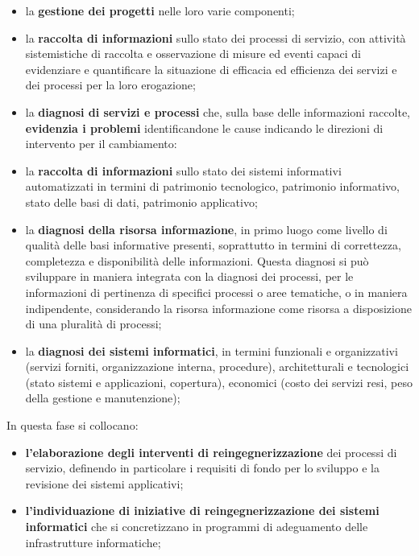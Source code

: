 \begin{description}
        \begin{itemize}
            \item la \textbf{gestione dei progetti} nelle loro varie componenti;
            \item la \textbf{raccolta di informazioni} sullo stato dei processi di servizio, con attività sistemistiche di raccolta e osservazione di misure ed eventi capaci di evidenziare e quantificare la situazione di efficacia ed efficienza dei servizi e dei processi per la loro erogazione;
            \item la \textbf{diagnosi di servizi e processi} che, sulla base delle informazioni raccolte, \textbf{evidenzia i problemi} identificandone le cause indicando le direzioni di intervento per il cambiamento:
            \item la \textbf{raccolta di informazioni} sullo stato dei sistemi informativi automatizzati in termini di patrimonio tecnologico, patrimonio informativo, stato delle basi di dati, patrimonio applicativo;
            \item la \textbf{diagnosi della risorsa informazione}, in primo luogo come livello di qualità delle basi informative presenti, soprattutto in termini di correttezza, completezza e disponibilità delle informazioni.
                Questa diagnosi si può sviluppare in maniera integrata con la diagnosi dei processi, per le informazioni di pertinenza di specifici processi o aree tematiche, o in maniera indipendente, considerando la risorsa informazione come risorsa a disposizione di una pluralità di processi;
            \item la \textbf{diagnosi dei sistemi informatici}, in termini funzionali e organizzativi (servizi forniti, organizzazione interna, procedure), architetturali e tecnologici (stato sistemi e applicazioni, copertura), economici (costo dei servizi resi, peso della gestione e manutenzione);
        \end{itemize}
    \item[Intervento] In questa fase si collocano:
        \begin{itemize}
            \item \textbf{l'elaborazione degli interventi di reingegnerizzazione} dei processi di servizio, definendo in particolare i requisiti di fondo per lo sviluppo e la revisione dei sistemi applicativi;
            \item \textbf{l'individuazione di iniziative di reingegnerizzazione dei sistemi informatici} che si concretizzano in programmi di adeguamento delle infrastrutture informatiche;
        \end{itemize}
\end{description}
%
